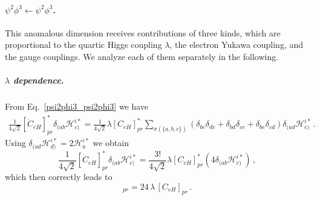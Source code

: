 \paragraph{$\psi^2\phi^3 \leftarrow \psi^2\phi^3$.}
This anomalous dimension receives contributions of three kinds, which are proportional to the quartic Higgs coupling $\lambda$, the electron Yukawa coupling, and the gauge couplings.
We analyze each of them separately in the following.

\subparagraph{$\lambda$ dependence.}
From Eq.~\eqref{psi2phi3_psi2phi3} we have
\begin{align}
    \frac{1}{4\sqrt{2}}[\dot C_{eH}]^*_{pr} \delta_{(ab}\mathcal H_{c)}^{i*} = \frac{1}{4\sqrt{2}} \lambda [C_{eH}]^*_{pr}\sum_{\sigma(\{a,b,c\})}  (\delta_{bc}\delta_{de} + \delta_{bd}\delta_{ce} + \delta_{be}\delta_{cd}) \delta_{(ad}\mathcal H_{e)}^{i *}\,.
\end{align}
Using $\delta_{(ad}\mathcal H_{d)}^{i*} = 2 \mathcal H_a^{i*}$ we obtain
\begin{equation}
    \frac{1}{4\sqrt{2}}[\dot C_{eH}]^*_{pr} \delta_{(ab}\mathcal H_{c)}^{i*} = \frac{3!}{4\sqrt{2}} \lambda [C_{eH}]^*_{pr} \left(4 \delta_{(ab}\mathcal H_{c)}^{i*} \right)\,,
\end{equation}
which then correctly leads to \cite{Jenkins:2013zja}
\begin{equation}
    [\dot C_{eH}]_{pr} = 24\, \lambda\, [ C_{eH}]_{pr}\,.
\end{equation}

